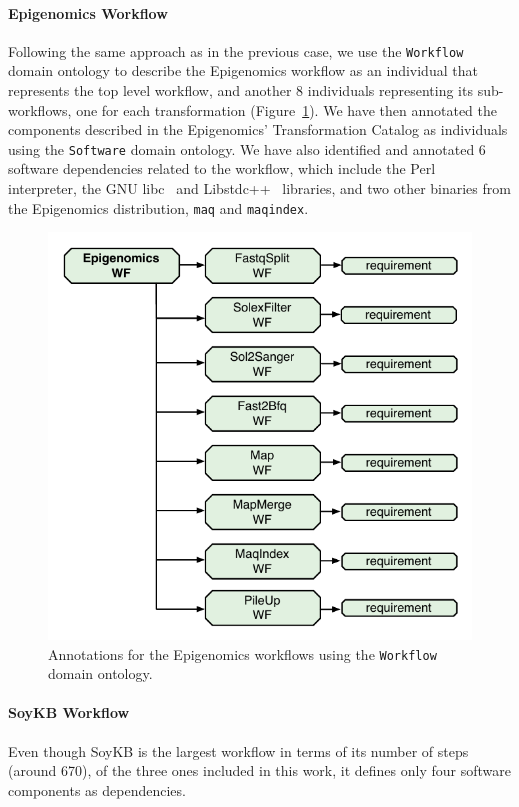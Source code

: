 \paragraph{\textbf{Epigenomics Workflow}}
Following the same approach as in the previous case, we use the \texttt{Workflow} 
domain ontology to describe the Epigenomics workflow as an individual that represents 
the top level workflow, and another 8 individuals representing its sub-workflows, one 
for each transformation (Figure~\ref{fig:annotations-genome}). We have then annotated 
the components described in the Epigenomics' Transformation Catalog as individuals 
using the \texttt{Software} domain ontology. We have also identified and annotated 6 
software dependencies related to the workflow, which include the Perl~\cite{perl} interpreter, 
the GNU libc~\cite{libc} and Libstdc++~\cite{libstdc} libraries, and two other binaries from 
the Epigenomics  distribution, \texttt{maq} and \texttt{maqindex}.

\begin{figure}[!htb]
	\centering
	\includegraphics[width=.7\linewidth]{figures/annotations-genome}
	\vspace{-10pt}
	\caption{Annotations for the Epigenomics workflows using the \texttt{Workflow} domain ontology.}
	\label{fig:annotations-genome}
\end{figure}


\paragraph{\textbf{SoyKB Workflow}}

Even though SoyKB is the largest workflow in terms of its number of steps (around 670), of the three ones included in this work, it defines only four software components as dependencies. 

